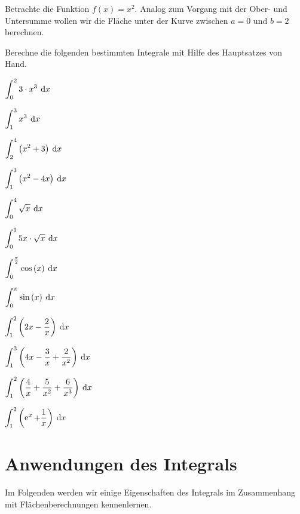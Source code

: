 \documentclass[11pt,oneside]{article}
\begin{document}
	\begin{beispiel}
		Betrachte die Funktion $f(x)=x^2$. Analog zum Vorgang mit der Ober- und Untersumme wollen wir die Fläche unter der Kurve zwischen $a=0$ und $b=2$ berechnen.
		\vspace{5pt}\\
	\end{beispiel}
	\begin{aufgabe}
		Berechne die folgenden bestimmten Integrale mit Hilfe des Hauptsatzes von Hand.
		\begin{enumcols}[4]
			\item $\displaystyle\int_0^2 3\cdot x^3\:\operatorname{d}\!{x}$
			\item $\displaystyle\int_1^3 x^3\:\operatorname{d}\!{x}$
			\item $\displaystyle\int_2^4\left(x^2+3\right)\:\operatorname{d}\!{x}$
			\item $\displaystyle\int_1^3\left(x^2-4x\right)\:\operatorname{d}\!{x}$
			\item $\displaystyle\int_0^4\sqrt{x}\:\operatorname{d}\!{x}$
			\item $\displaystyle\int_0^1 5x\cdot\sqrt{x}\:\operatorname{d}\!{x}$
			\item $\ds\int_0^{\frac{\pi}{2}}\cos{x}\d{x}$
			\item $\ds\int_0^\pi\sin{x}\d{x}$
			\item $\displaystyle\int_1^2\left(2x-\frac{2}{x}\right)\:\operatorname{d}\!{x}$
			\item $\displaystyle\int_1^3\left(4x-\frac{3}{x}+\frac{2}{x^2}\right)\:\operatorname{d}\!{x}$
			\item $\displaystyle\int_1^2\left(\frac{4}{x}+\frac{5}{x^2}+\frac{6}{x^3}\right)\:\operatorname{d}\!{x}$
			\item $\displaystyle\int_1^2\left(\operatorname{e}^x+\frac{1}{x}\right)\:\operatorname{d}\!{x}$
		\end{enumcols}
	\end{aufgabe}
	\newpage



\section{Anwendungen des Integrals}
	Im Folgenden werden wir einige Eigenschaften des Integrals im Zusammenhang mit Flächenberechnungen kennenlernen.
\end{document}
